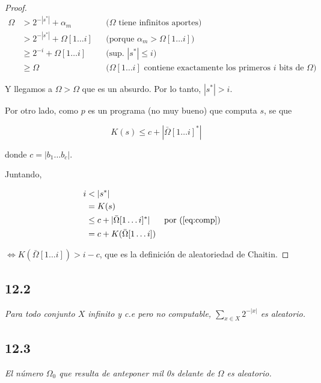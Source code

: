 \documentclass{article}
\theoremstyle{definition} %
\newcommand{\first}[2]{#2[1 \dots #1]}
\begin{document}
\begin{proof}
    \begin{align*}
        \Omega 
        &> 2^{-|s^*|} + \alpha_m
            &&\text{($\Omega$ tiene infinitos aportes)}\\
        &> 2^{-|s^*|} + \first{i}{\Omega}
            &&\text{(porque $\alpha_m > \first{i}{\Omega}$)}\\
        &\geq 2^{-i} + \first{i}{\Omega}
            &&\text{(sup. $|s^*| \leq i$)}\\
        &\geq \Omega
            &&\text{($\first{i}{\Omega}$ contiene exactamente los primeros $i$ bits de $\Omega$)}
    \end{align*}

    Y llegamos a $\Omega > \Omega$ que es un absurdo. Por lo tanto, $|s^*| > i$.
    
    Por otro lado, como $p$ es un programa (no muy bueno) que computa $s$, se que

    \begin{equation}\label{eq:comp}
         K(s) \leq c + |\first{i}{\bar{\Omega}}^*|
    \end{equation}

    donde $c = |b_1 \dots b_c|$.

    Juntando,

    \begin{align*}
        i
            &< |s^*|\\
            &= K(s)\\
            &\leq c + |\first{i}{\bar{\Omega}}^*| &&\text{por (\ref{eq:comp})}\\
            &= c + K(\first{i}{\bar{\Omega}})
    \end{align*}

    $\iff K(\first{i}{\bar{\Omega}}) > i - c$, que es la definición de
    aleatoriedad de Chaitin.

\end{proof}

\subsection*{12.2}

\textit{Para todo conjunto $X$ infinito y c.e pero no computable, $\sum_{x \in
X} 2^{-|x|}$ es aleatorio.}

\subsection*{12.3}

\textit{El número $\Omega_0$ que resulta de anteponer mil 0s delante de $\Omega$ es aleatorio.}
\end{document}
